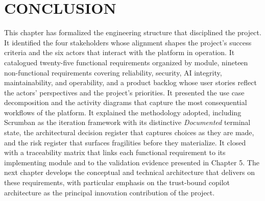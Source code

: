 \section{CONCLUSION}
This chapter has formalized the engineering structure that disciplined the project. It identified the four stakeholders whose alignment shapes the project's success criteria and the six actors that interact with the platform in operation. It catalogued twenty-five functional requirements organized by module, nineteen non-functional requirements covering reliability, security, AI integrity, maintainability, and operability, and a product backlog whose user stories reflect the actors' perspectives and the project's priorities. It presented the use case decomposition and the activity diagrams that capture the most consequential workflows of the platform. It explained the methodology adopted, including Scrumban as the iteration framework with its distinctive \textit{Documented} terminal state, the architectural decision register that captures choices as they are made, and the risk register that surfaces fragilities before they materialize. It closed with a traceability matrix that links each functional requirement to its implementing module and to the validation evidence presented in Chapter 5. The next chapter develops the conceptual and technical architecture that delivers on these requirements, with particular emphasis on the trust-bound copilot architecture as the principal innovation contribution of the project.